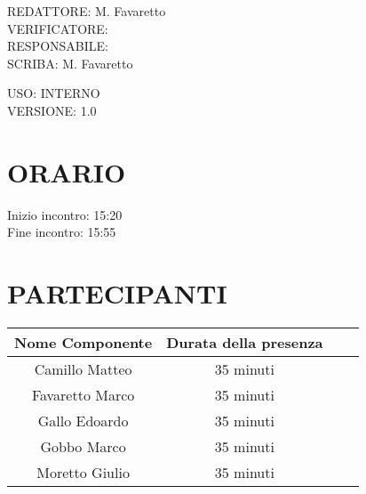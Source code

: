 \documentclass[5pt]{article}
\begin{document}
\vspace{13pt}

\begin{flushleft}
    \begin{spacing}{1.5}
        REDATTORE:  M. Favaretto \\
        VERIFICATORE:  \\%
        RESPONSABILE:  \\%
        \vspace{7pt}
        SCRIBA: M. Favaretto\\%
    \end{spacing}
\end{flushleft}

\begin{flushright}
    \begin{spacing}{1}
        USO: INTERNO\\
        VERSIONE: 1.0\\ %
    \end{spacing}
\end{flushright}


\restoregeometry

\pagebreak


\section{\Large ORARIO}
\begin{spacing}{1.5}
    {\large Inizio incontro: 15:20}\\
    {\large Fine incontro: 15:55}
\end{spacing}

\section{PARTECIPANTI}
\setlength\cellspacetoplimit{6pt}
\setlength\cellspacebottomlimit{6pt}

\begin{table}[ht]
  \begin{tabular}{|Sc|Sc|}
    \hline
    \textbf{Nome Componente} & \textbf{Durata della presenza} \\
    \hline
    Camillo Matteo & 35 minuti \\
    Favaretto Marco & 35 minuti \\
    Gallo Edoardo & 35 minuti \\
    Gobbo Marco & 35 minuti \\
    Moretto Giulio & 35 minuti \\
    \hline
  \end{tabular}
  \label{tab:conference}
\end{table}
\end{document}
